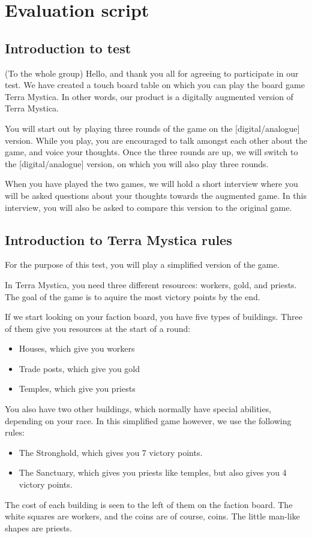 \chapter{Evaluation script}\label{ch:TestScript}
\section{Introduction to test}
(To the whole group)
Hello, and thank you all for agreeing to participate in our test. We have created a touch board table on which you can play the board game Terra Mystica. In other words, our product is a digitally augmented version of Terra Mystica.

You will start out by playing three rounds of the game on the [digital/analogue] version. While you play, you are encouraged to talk amongst each other about the game, and voice your thoughts. Once the three rounds are up, we will switch to the [digital/analogue] version, on which you will also play three rounds.

When you have played the two games, we will hold a short interview where you will be asked questions about your thoughts towards the augmented game. In this interview, you will also be asked to compare this version to the original game.

\section{Introduction to Terra Mystica rules}
For the purpose of this test, you will play a simplified version of the game.

In Terra Mystica, you need three different resources: workers, gold, and priests. The goal of the game is to aquire the most victory points by the end.

If we start looking on your faction board, you have five types of buildings. Three of them give you resources at the start of a round:
\begin{itemize}
\item Houses, which give you workers
\item Trade posts, which give you gold
\item Temples, which give you priests
\end{itemize}
You also have two other buildings, which normally have special abilities, depending on your race. In this simplified game however, we use the following rules:
\begin{itemize}
\item The Stronghold, which gives you 7 victory points.
\item The Sanctuary, which gives you priests like temples, but also gives you 4 victory points.
\end{itemize}
The cost of each building is seen to the left of them on the faction board. The white squares are workers, and the coins are of course, coins. The little man-like shapes are priests.

